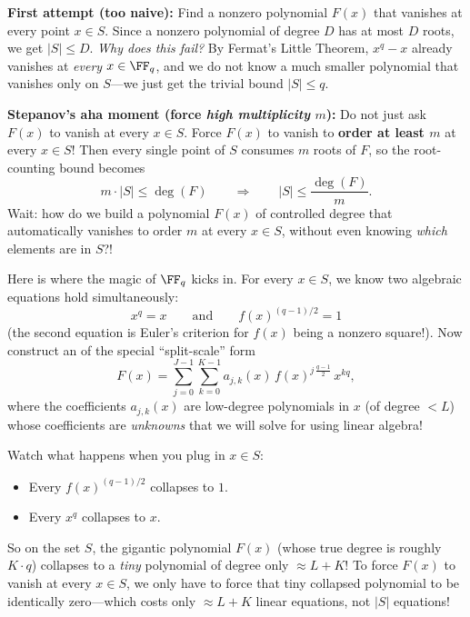 \textbf{First attempt (too naive):} Find a nonzero polynomial \(F(x)\) that vanishes at every point \(x \in S\). Since a nonzero polynomial of degree \(D\) has at most \(D\) roots, we get \(|S| \le D\).
\emph{Why does this fail?} By Fermat's Little Theorem, \(x^q - x\) already vanishes at \emph{every} \(x \in \FF_q\), and we do not know a much smaller polynomial that vanishes only on \(S\)---we just get the trivial bound \(|S| \le q\).

\textbf{Stepanov's aha moment (force \emph{high multiplicity} \(m\)):} Do not just ask \(F(x)\) to vanish at every \(x \in S\). Force \(F(x)\) to vanish to \textbf{order at least \(m\)} at every \(x \in S\)! Then every single point of \(S\) consumes \(m\) roots of \(F\), so the root-counting bound becomes
\begin{equation}
  m \cdot |S| \le \deg(F)
  \qquad \Longrightarrow \qquad
  |S| \le \frac{\deg(F)}{m}.
  \label{eq:N20261125-stepanov-master}
\end{equation}
Wait: how do we build a polynomial \(F(x)\) of controlled degree that automatically vanishes to order \(m\) at every \(x \in S\), without even knowing \emph{which} elements are in \(S\)?!

Here is where the magic of \(\FF_q\) kicks in. For every \(x \in S\), we know two algebraic equations hold simultaneously:
\[
  x^q = x
  \qquad \text{and} \qquad
  f(x)^{(q-1)/2} = 1
\]
(the second equation is Euler's criterion for \(f(x)\) being a nonzero square!). Now construct an  of the special ``split-scale'' form
\begin{equation}
  F(x) = \sum_{j=0}^{J-1} \sum_{k=0}^{K-1} a_{j,k}(x)\, f(x)^{j\,\frac{q-1}{2}}\, x^{kq},
  \label{eq:N20261125-auxpoly}
\end{equation}
where the coefficients \(a_{j,k}(x)\) are low-degree polynomials in \(x\) (of degree \(< L\)) whose coefficients are \emph{unknowns} that we will solve for using linear algebra!

Watch what happens when you plug in \(x \in S\):
\begin{itemize}
  \item Every \(f(x)^{(q-1)/2}\) collapses to \(1\).
  \item Every \(x^q\) collapses to \(x\).
\end{itemize}
So on the set \(S\), the gigantic polynomial \(F(x)\) (whose true degree is roughly \(K \cdot q\)) collapses to a \emph{tiny} polynomial of degree only \(\approx L + K\)! To force \(F(x)\) to vanish at every \(x \in S\), we only have to force that tiny collapsed polynomial to be identically zero---which costs only \(\approx L + K\) linear equations, not \(|S|\) equations!


